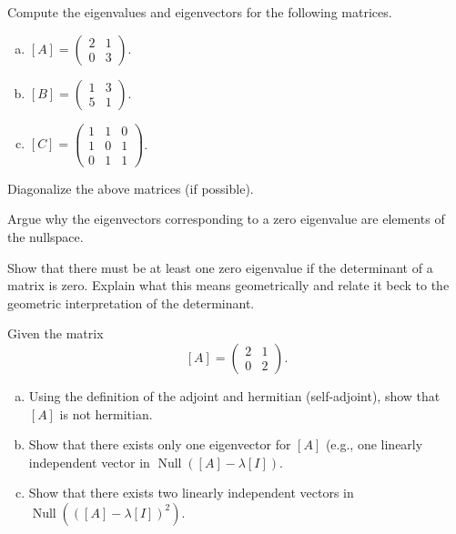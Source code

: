 \documentclass[12pt]{article} %
\begin{document}
\begin{problem}
    Compute the eigenvalues and eigenvectors for the following matrices.
\begin{enumerate}[(a)]
    \item $[A] = \begin{pmatrix} 2 & 1 \\ 0 & 3 \end{pmatrix}$.
    \item $[B] = \begin{pmatrix} 1 & 3 \\ 5 & 1 \end{pmatrix}$.
    \item $[C] = \begin{pmatrix} 1 & 1 & 0 \\ 1 & 0 & 1 \\ 0 & 1 & 1 \end{pmatrix}$.
\end{enumerate}
\end{problem}

\begin{problem}
Diagonalize the above matrices (if possible).
\end{problem}

\begin{problem}
Argue why the eigenvectors corresponding to a zero eigenvalue are elements of the nullspace.
\end{problem}

\begin{problem}
Show that there must be at least one zero eigenvalue if the determinant of a matrix is zero. Explain what this means geometrically and relate it beck to the geometric interpretation of the determinant.
\end{problem}

\begin{problem}
Given the matrix
\[
[A] = \begin{pmatrix} 2 & 1 \\ 0 & 2 \end{pmatrix}.
\]
\begin{enumerate}[(a)]
    \item Using the definition of the adjoint and hermitian (self-adjoint), show that $[A]$ is not hermitian.
    \item Show that there exists only one eigenvector for $[A]$ (e.g., one linearly independent vector in $\operatorname{Null}([A]-\lambda[I])$.
    \item Show that there exists two linearly independent vectors in $\operatorname{Null}(([A]-\lambda [I])^2)$. 
\end{enumerate}
\end{problem}
\end{document}

